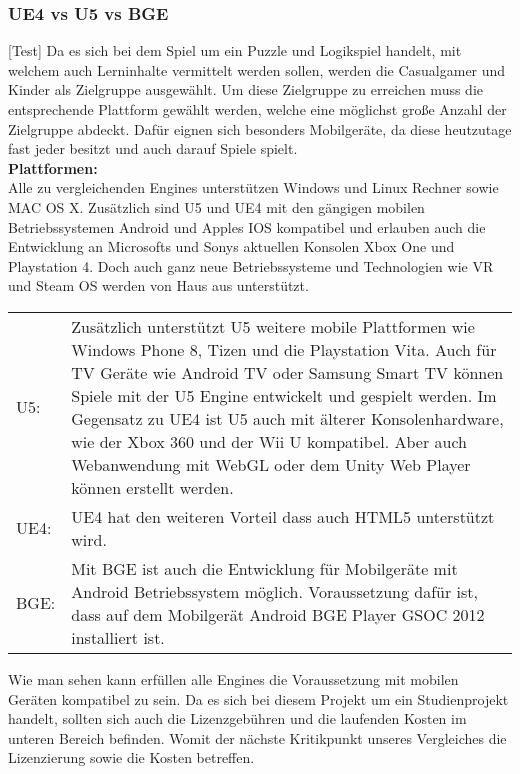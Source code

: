 \subsubsection{\ac{UE4} vs \ac{U5} vs \ac{BGE}}[Test]
Da es sich bei dem Spiel um ein Puzzle und Logikspiel handelt, mit welchem auch Lerninhalte vermittelt werden sollen, werden die Casualgamer und Kinder als Zielgruppe ausgewählt. Um diese Zielgruppe zu erreichen muss die entsprechende Plattform gewählt werden, welche eine möglichst große Anzahl der Zielgruppe abdeckt. Dafür eignen sich besonders Mobilgeräte, da diese heutzutage fast jeder besitzt und auch darauf Spiele spielt.  \\

\textbf{Plattformen:}\\
Alle zu vergleichenden Engines unterstützen Windows und Linux Rechner sowie MAC OS X. Zusätzlich sind \ac{U5} und \ac{UE4} mit den gängigen mobilen Betriebssystemen Android und Apples IOS kompatibel und erlauben auch die Entwicklung an Microsofts und Sonys aktuellen Konsolen Xbox One und Playstation 4. Doch auch ganz neue Betriebssysteme und Technologien wie VR und Steam OS werden von Haus aus unterstützt.

\begin{table}[H]
\centering
\renewcommand{\arraystretch}{1.5}
\begin{tabular}{lp{14.5cm}}
\ac{U5}:  & Zusätzlich unterstützt \ac{U5} weitere mobile Plattformen wie Windows Phone 8, Tizen und die Playstation Vita. Auch für TV Geräte wie Android TV oder Samsung Smart TV können Spiele mit der \ac{U5} Engine entwickelt und gespielt werden. Im Gegensatz zu \ac{UE4} ist \ac{U5} auch mit älterer Konsolenhardware, wie der Xbox 360 und der Wii U kompatibel. Aber auch Webanwendung mit WebGL oder dem Unity Web Player können erstellt werden. \\

\ac{UE4}: & \ac{UE4} hat den weiteren Vorteil dass auch HTML5 unterstützt wird. \\

\ac{BGE}:     & Mit \ac{BGE} ist auch die Entwicklung für Mobilgeräte mit Android Betriebssystem möglich. Voraussetzung dafür ist, dass auf dem Mobilgerät Android \ac{BGE} Player GSOC 2012 installiert ist. 
\end{tabular}
\end{table}

Wie man sehen kann erfüllen alle Engines die Voraussetzung mit mobilen Geräten kompatibel zu sein. Da es sich bei diesem Projekt um ein Studienprojekt handelt, sollten sich auch die Lizenzgebühren und die laufenden Kosten im unteren Bereich befinden. Womit der nächste Kritikpunkt unseres Vergleiches die Lizenzierung sowie die Kosten betreffen.



